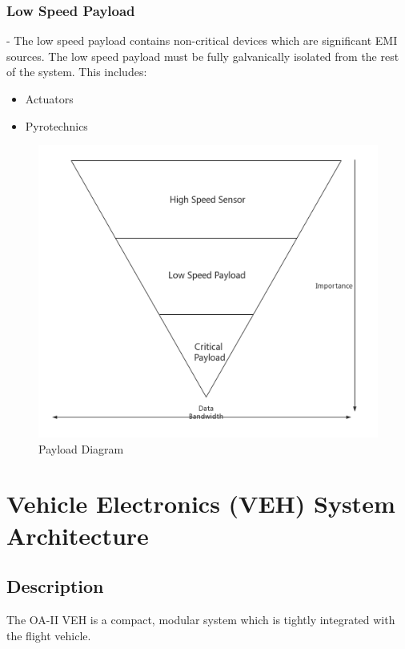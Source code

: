 \documentclass[12pt,article]{memoir}
\begin{document}
\subsection{Low Speed Payload} - The low speed payload contains non-critical devices which are significant EMI sources. The low speed payload must be fully galvanically isolated from the rest of the system. This includes:
\begin{itemize}
\item Actuators
\item Pyrotechnics
\end{itemize}
\begin{figure}[htp]
\includegraphics[width=\textwidth]{payloadCata.png}
 \caption{Payload Diagram}	
\end{figure}

\newpage

\chapter{Vehicle Electronics (VEH) System Architecture}
\section{Description}
The OA-II VEH is a compact, modular system which is tightly integrated with the flight vehicle.
\end{document}
